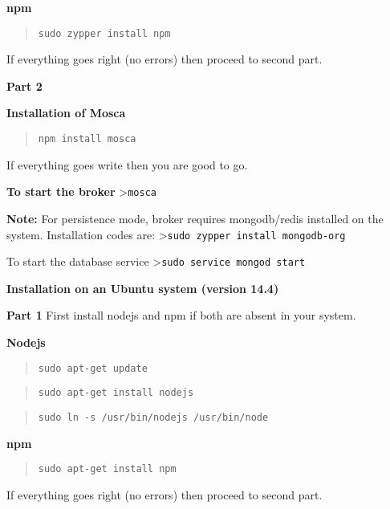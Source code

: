 \documentclass[16pt]{article}
\begin{document}
\textbf{npm}

\begin{quote}
\texttt{sudo zypper install npm}
\end{quote}

If everything goes right (no errors) then proceed to second part.
 \vspace{0.5cm}

\textbf{Part 2}

\textbf{Installation of Mosca}

\begin{quote}
\texttt{npm install mosca}
\end{quote}

If everything goes write then you are good to go.
 \vspace{0.5cm}

\textbf{To start the broker} \textgreater{}\texttt{mosca}

\textbf{Note:} For persistence mode, broker requires mongodb/redis
installed on the system. Installation codes are:
\textgreater{}\texttt{sudo zypper install mongodb-org}

To start the database service
\textgreater{}\texttt{sudo service mongod start}
 \vspace{0.5cm}


\textbf{Installation on an Ubuntu system (version
14.4)}

\textbf{Part 1} First install nodejs and npm if both are absent in your
system.

\textbf{Nodejs}

\begin{quote}
\texttt{sudo apt-get update}
\end{quote}

\begin{quote}
\texttt{sudo apt-get install nodejs}
\end{quote}

\begin{quote}
\texttt{sudo ln -s /usr/bin/nodejs /usr/bin/node}
\end{quote}

\textbf{npm}

\begin{quote}
\texttt{sudo apt-get install npm}
\end{quote}

If everything goes right (no errors) then proceed to second part.
\end{document}
